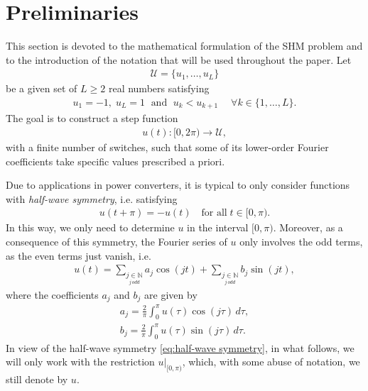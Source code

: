 \documentclass[twocolumn]{autart}    %
\begin{document}
\section{Preliminaries}\label{sec:math_formulation}

This section is devoted to the mathematical formulation of the SHM problem and to the introduction of the notation that will be used throughout the paper. Let 
\begin{align}\label{eq:Udef}
	\mathcal{U} = \{u_1, \ldots, u_L\}
\end{align}
be a given set of $L\geq 2$ real numbers satisfying
\begin{align*}
	u_1 = -1, \; u_L = 1 \;\text{ and } \; u_k<u_{k+1} \quad\; \forall k\in \{1,\ldots, L\}.
\end{align*}
The goal is to construct a step function
\begin{align*}
	u(t):[0,2\pi)\to\mathcal U,
\end{align*}
with a finite number of switches, such that some of its lower-order Fourier coefficients take specific values prescribed a priori.

Due to applications in power converters,  it is typical to only consider functions with \textit{half-wave symmetry}, i.e. satisfying
\begin{align}\label{eq:half-wave symmetry}
	u(t + \pi) = -u(t)\quad \mbox{for all}\; t \in [0,\pi).
\end{align}
In this way, we only need to determine $u$ in the interval $[0,\pi)$. Moreover, as a consequence of this symmetry, the Fourier series of $u$ only involves the odd terms, as the even terms just vanish, i.e.
\begin{align*}
	u(t) = \sum_{\underset{j\, odd}{j \in \mathbb{N}}} a_j \cos(jt)+ \sum_{\underset{j\, odd}{j \in \mathbb{N}}}  b_j \sin(jt),
\end{align*}
where the coefficients $a_j$ and $b_j$ are given by
\begin{equation} \label{eq:an}
	\begin{aligned}
		a_j = \frac{2}{\pi} \int_0^\pi u(\tau ) \cos(j \tau)\,d\tau, 
		\\[5pt]
		b_j = \frac{2}{\pi} \int_0^\pi u(\tau)  \sin(j \tau)\,d\tau.
	\end{aligned}
\end{equation}
In view of the half-wave symmetry \eqref{eq:half-wave symmetry}, in what follows, we will only work with the restriction $u|_{[0,\pi)}$, which, with some abuse of notation, we still denote by $u$. 
\end{document}
